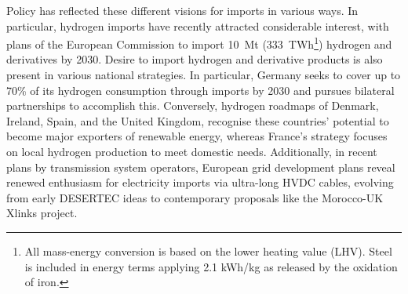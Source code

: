 \documentclass[5p,10pt]{elsarticle}
\begin{document}
Policy has reflected these different visions for imports in various ways. In
particular, hydrogen imports have recently attracted considerable interest, with
plans of the European Commission\cite{europeancommissionRepowerEUPlan} to import
10~Mt (333~TWh\footnote{All mass-energy conversion is based on the lower heating
value (LHV). Steel is included in energy terms applying 2.1 kWh/kg as released
by the oxidation of iron.}) hydrogen and derivatives by 2030. Desire to import
hydrogen and derivative products is also present in various national
strategies.\cite{corbeauNationalHydrogenStrategies2024} In particular, Germany
seeks to cover up to 70\% of its hydrogen consumption through imports by 2030
and pursues bilateral partnerships to accomplish
this.\cite{bundesministeriumfuerwirtschaftundklimaschutzFortschreibungNationalenWasserstoffstrategie2023}
Conversely, hydrogen roadmaps of
Denmark,\cite{danishministryofclimateenergyandutilitiesRegeringensStrategiPowertoX2021}
Ireland,\cite{departmentoftheenvironmentclimateandcommunicationsgovernmentofirelandNationalHydrogenStrategy2023}
Spain,\cite{marcoestrategicodeenergiayclimaRutaHidrogenoApuesta2020} and the
United
Kingdom,\cite{ukdepartmentforenergysecurity&netzeroHydrogenStrategyUpdate2023}
recognise these countries' potential to become major exporters of renewable
energy, whereas France's strategy focuses on local hydrogen production to meet
domestic needs.\cite{frenchgovernmentStrategieNationalePour2023} Additionally,
in recent plans by transmission system
operators,\cite{entso-eTYNDP2024Project2024}  European grid development plans
reveal renewed enthusiasm for electricity imports via ultra-long HVDC cables,
evolving from early
DESERTEC\cite{desertecfoundationDESERTECSustainableWealth2024} ideas to
contemporary proposals like the Morocco-UK Xlinks
project.\cite{xlinksMoroccoUKPower2023}

\end{document}
